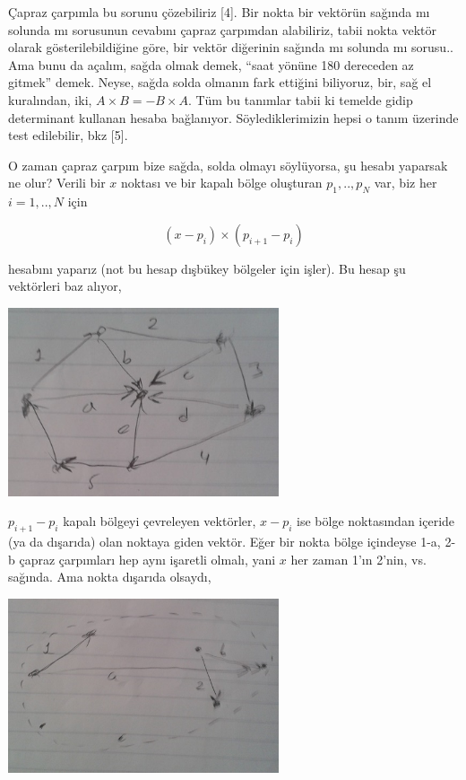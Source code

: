 \documentclass[12pt,fleqn]{article}\usepackage{../../common}
\begin{document}
Çapraz çarpımla bu sorunu çözebiliriz [4]. Bir nokta bir vektörün sağında
mı solunda mı sorusunun cevabını çapraz çarpımdan alabiliriz, tabii nokta
vektör olarak gösterilebildiğine göre, bir vektör diğerinin sağında mı
solunda mı sorusu.. Ama bunu da açalım, sağda olmak demek, ``saat yönüne
180 dereceden az gitmek'' demek. Neyse, sağda solda olmanın fark ettiğini
biliyoruz, bir, sağ el kuralından, iki, $A \times B = -B \times A$. Tüm bu
tanımlar tabii ki temelde gidip determinant kullanan hesaba
bağlanıyor. Söylediklerimizin hepsi o tanım üzerinde test edilebilir, bkz
[5].

O zaman çapraz çarpım bize sağda, solda olmayı söylüyorsa, şu hesabı yaparsak ne
olur? Verili bir $x$ noktası ve bir kapalı bölge oluşturan $p_1,..,p_N$ var, biz
her $i = 1,..,N$ için 

$$ (x-p_i) \times (p_{i+1}-p_i) $$

hesabını yaparız (not bu hesap dışbükey bölgeler için işler). Bu hesap şu
vektörleri baz alıyor,

\includegraphics[width=8cm]{enc_04.png}

$p_{i+1}-p_i$  kapalı bölgeyi çevreleyen vektörler, $x-p_i$ ise bölge
noktasından içeride (ya da dışarıda) olan noktaya giden vektör. Eğer bir nokta
bölge içindeyse 1-a, 2-b çapraz çarpımları hep aynı işaretli olmalı, yani $x$
her zaman 1'ın 2'nin, vs. sağında. Ama nokta dışarıda olsaydı,

\includegraphics[width=8cm]{enc_06.png}
\end{document}

